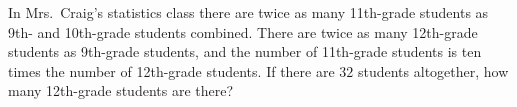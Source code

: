 In Mrs.~Craig's statistics class there are twice as many 11th-grade students as 9th- and 10th-grade students combined. There are twice as many 12th-grade students as 9th-grade students, and the number of 11th-grade students is ten times the number of 12th-grade students. If there are $32$ students altogether, how many 12th-grade students are there?

